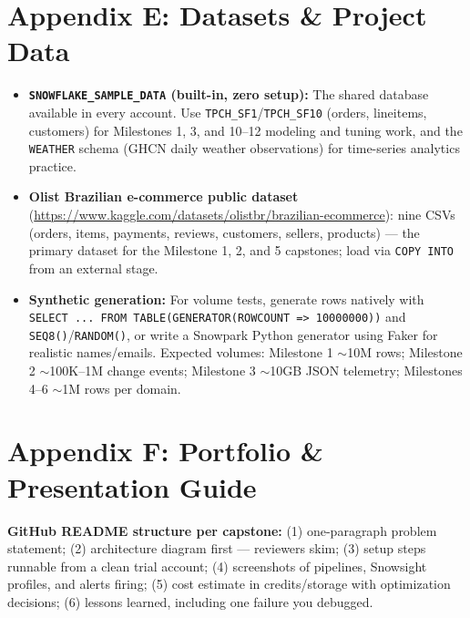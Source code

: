 \documentclass[11pt, a4paper]{article}
\begin{document}
\section{Appendix E: Datasets \& Project Data}

\begin{itemize}[label=-]
    \item \textbf{\texttt{SNOWFLAKE\_SAMPLE\_DATA} (built-in, zero setup):} The shared database available in every account. Use \texttt{TPCH\_SF1}/\texttt{TPCH\_SF10} (orders, lineitems, customers) for Milestones 1, 3, and 10--12 modeling and tuning work, and the \texttt{WEATHER} schema (GHCN daily weather observations) for time-series analytics practice.
    \item \textbf{Olist Brazilian e-commerce public dataset} (\url{https://www.kaggle.com/datasets/olistbr/brazilian-ecommerce}): nine CSVs (orders, items, payments, reviews, customers, sellers, products) --- the primary dataset for the Milestone 1, 2, and 5 capstones; load via \texttt{COPY INTO} from an external stage.
    \item \textbf{Synthetic generation:} For volume tests, generate rows natively with \texttt{SELECT ... FROM TABLE(GENERATOR(ROWCOUNT => 10000000))} and \texttt{SEQ8()}/\texttt{RANDOM()}, or write a Snowpark Python generator using Faker for realistic names/emails. Expected volumes: Milestone 1 $\sim$10M rows; Milestone 2 $\sim$100K--1M change events; Milestone 3 $\sim$10GB JSON telemetry; Milestones 4--6 $\sim$1M rows per domain.
\end{itemize}

\section{Appendix F: Portfolio \& Presentation Guide}

\noindent\textbf{GitHub README structure per capstone:} (1) one-paragraph problem statement; (2) architecture diagram first --- reviewers skim; (3) setup steps runnable from a clean trial account; (4) screenshots of pipelines, Snowsight profiles, and alerts firing; (5) cost estimate in credits/storage with optimization decisions; (6) lessons learned, including one failure you debugged.
\end{document}
